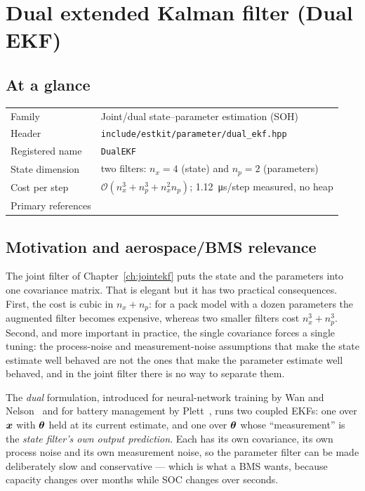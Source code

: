 \chapter{Dual extended Kalman filter (Dual EKF)}
\label{ch:dualekf}

\section*{At a glance}
\begin{tabular}{@{}l>{\raggedright\arraybackslash}p{}@{}}
Family & Joint/dual state--parameter estimation (SOH) \\
Header & \texttt{include/estkit/parameter/dual\_ekf.hpp} \\
Registered name & \texttt{DualEKF} \\
State dimension & two filters: $n_x=4$ (state) and $n_p=2$ (parameters) \\
Cost per step & $\mathcal{O}(n_x^3+n_p^3+n_x^2 n_p)$; \SI{1.12}{\micro\second}/step measured, no heap \\
Primary references & \cite{plett2004ekf3,wannelson2001dual,ljung1979ekf} \\
\end{tabular}

\section{Motivation and aerospace/BMS relevance}
The joint filter of Chapter~\ref{ch:jointekf} puts the state and the parameters into one covariance
matrix.  That is elegant but it has two practical consequences.  First, the cost is cubic in
$n_x+n_p$: for a pack model with a dozen parameters the augmented filter becomes expensive, whereas
two smaller filters cost $n_x^3+n_p^3$.  Second, and more important in practice, the single
covariance forces a single tuning: the process-noise and measurement-noise assumptions that make
the state estimate well behaved are not the ones that make the parameter estimate well behaved, and
in the joint filter there is no way to separate them.

The \emph{dual} formulation, introduced for neural-network training by Wan and
Nelson~\cite{wannelson2001dual} and for battery management by Plett~\cite{plett2004ekf3}, runs two
coupled EKFs: one over $\bm{x}$ with $\bm{\theta}$ held at its current estimate, and one over $\bm{\theta}$
whose ``measurement'' is the \emph{state filter's own output prediction}.  Each has its own
covariance, its own process noise and its own measurement noise, so the parameter filter can be made
deliberately slow and conservative --- which is what a BMS wants, because capacity changes over
months while SOC changes over seconds.

